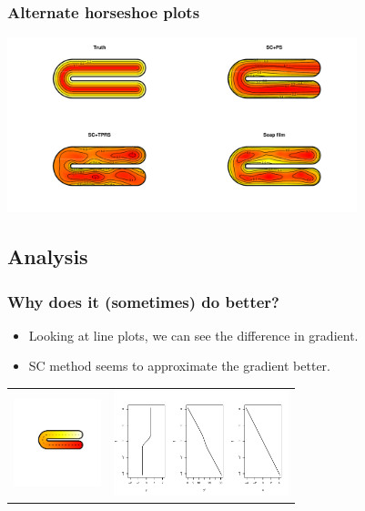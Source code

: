 \documentclass[ignorenonframetext]{beamer} %
\newcommand{\bc}{\begin{center}}
\newcommand{\ec}{\end{center}}
\newcommand{\bi}{\begin{itemize}}
\newcommand{\ei}{\end{itemize}}
\begin{document}
\begin{frame}
	\frametitle{Alternate horseshoe plots}
            \centering
          \includegraphics[width=4in,trim=2in 1in 2in 1in]{figs/altramsaycomp}
\end{frame}

\subsection{Analysis}

\begin{frame}
	\frametitle{Why does it (sometimes) do better?}
       \bi
         \item Looking at line plots, we can see the difference in gradient.
         \item SC method seems to approximate the gradient better.
       \ei
       \bc\begin{tabular}{c c}
            \centering
          \includegraphics[width=1in, trim=1in 0.75in 0.5in 0.5in]{figs/horseshoecentreline-1} & \includegraphics[width=2in]{figs/centrelinelineplots}\\
       \end{tabular}\ec


\end{frame}
\end{document}
